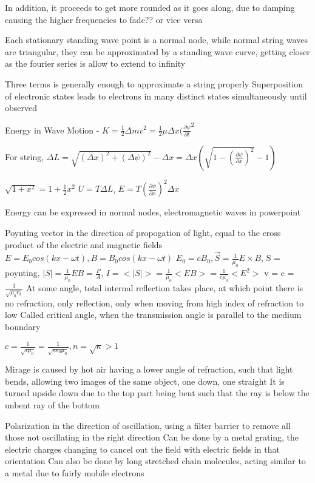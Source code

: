 \documentclass[11 pt, twoside]{article}
\begin{document}
In addition, it proceeds to get more rounded as it goes along, due to damping causing the higher frequencies to fade?? or vice versa

Each stationary standing wave point is a normal node, while normal string waves are triangular, they can be approximated by a standing wave curve, getting closer as the fourier series is allow to extend to infinity

Three terms is generally enough to approximate a string properly
Superposition of electronic states leads to electrons in many distinct states simultaneously until observed

Energy in Wave Motion - $K = \frac{1}{2}\Delta mv^2  = \frac{1}{2} \mu \Delta x (\frac{\partial \psi}{\partial t}^2$

For string, $\Delta L = \sqrt{(\Delta x)^2 + (\Delta \psi)^2} - \Delta x = \Delta x (\sqrt{1 - (\frac{\partial \psi}{\partial x})^2} - 1)$

$\sqrt{1 + x^2} = 1 + \frac{1}{2}x^2$
$U = T\Delta L$, $E = T(\frac{\partial \psi}{\partial x})^2 \Delta x$

Energy can be expressed in normal nodes, electromagnetic waves in powerpoint

Poynting vector in the direction of propogation of light, equal to the cross product of the electric and magnetic fields
$E = E_0 cos(kx - \omega t), B = B_0 cos(kx - \omega t)$
$E_0 = cB_0, \vec{S} = \frac{1}{\mu_0}E\times B$, S = poynting, $|S| = \frac{1}{\mu_0}EB = \frac{P}{A}$, $I = <|S|> = \frac{1}{\mu_0}<EB> = \frac{1}{c\mu_0}<E^2>$
v = c = $\frac{1}{\sqrt{\mu_0 \epsilon_0}}$
At some angle, total internal reflection takes place, at which point there is no refraction, only reflection, only when moving from high index of refraction to low
Called critical angle, when the transmission angle is parallel to the medium boundary

$c = \frac{1}{\sqrt{\epsilon \mu_0}} = \frac{1}{\sqrt{\kappa \epsilon_0 \mu_0}}, n = \sqrt{\kappa} > 1$

Mirage is caused by hot air having a lower angle of refraction, such that light bends, allowing two images of the same object, one down, one straight
It is turned upside down due to the top part being bent such that the ray is below the unbent ray of the bottom

Polarization in the direction of oscillation, using a filter barrier to remove all those not oscillating in the right direction
Can be done by a metal grating, the electric charges changing to cancel out the field with electric fields in that orientation
Can also be done by long stretched chain molecules, acting similar to a metal due to fairly mobile electrons
\end{document}
